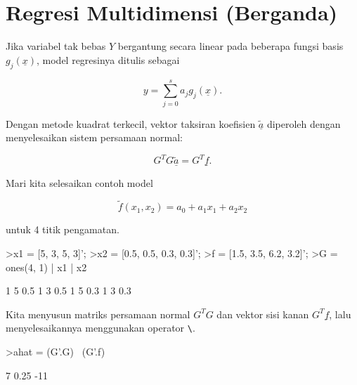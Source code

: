 \documentclass[a4paper,11pt,oneside,enabledeprecatedfontcommands]{scrbook}
\newenvironment{eulernotebook}{}{}
\newcommand{\eulerheading}[1]{\chapter{#1}}
\newenvironment{eulercomment}{\par\medskip\noindent}{\par\medskip}
\newenvironment{eulerformula}{}{}
\begin{document}
\begin{eulernotebook}
		\eulerheading{Regresi Multidimensi (Berganda)}
		\begin{eulercomment}
			Jika variabel tak bebas $Y$ bergantung secara linear pada beberapa fungsi basis $g_j(\underline{x})$,
			model regresinya ditulis sebagai
		\end{eulercomment}
		\begin{eulerformula}
			\[
			y = \sum_{j=0}^s a_j g_j(\underline{x}).
			\]
		\end{eulerformula}
		\begin{eulercomment}
			Dengan metode kuadrat terkecil, vektor taksiran koefisien $\tilde{\underline{a}}$
			diperoleh dengan menyelesaikan sistem persamaan normal:
		\end{eulercomment}
		\begin{eulerformula}
			\[
			G^T G \tilde{\underline{a}} = G^T \underline{f}.
			\]
		\end{eulerformula}
		\begin{eulercomment}
			Mari kita selesaikan contoh model
		\end{eulercomment}
		\begin{eulerformula}
			\[
			\tilde{f}(x_1, x_2) = a_0 + a_1 x_1 + a_2 x_2
			\]
		\end{eulerformula}
		\begin{eulercomment}
			untuk 4 titik pengamatan.
		\end{eulercomment}
		\begin{eulerprompt}
			>x1 = [5, 3, 5, 3]';
			>x2 = [0.5, 0.5, 0.3, 0.3]';
			>f = [1.5, 3.5, 6.2, 3.2]';
			>G = ones(4, 1) | x1 | x2
		\end{eulerprompt}
		\begin{euleroutput}
			        1         5       0.5 
			        1         3       0.5 
			        1         5       0.3 
			        1         3       0.3 
		\end{euleroutput}
		\begin{eulercomment}
			Kita menyusun matriks persamaan normal $G^T G$ dan vektor sisi kanan $G^T \underline{f}$,
			lalu menyelesaikannya menggunakan operator \texttt{\textbackslash}.
		\end{eulercomment}
		\begin{eulerprompt}
			>ahat = (G'.G) \ (G'.f)
		\end{eulerprompt}
		\begin{euleroutput}
			        7 
			     0.25 
			      -11 
		\end{euleroutput}
		\begin{eulercomment}

\end{eulercomment}
\end{eulernotebook}
\end{document}
